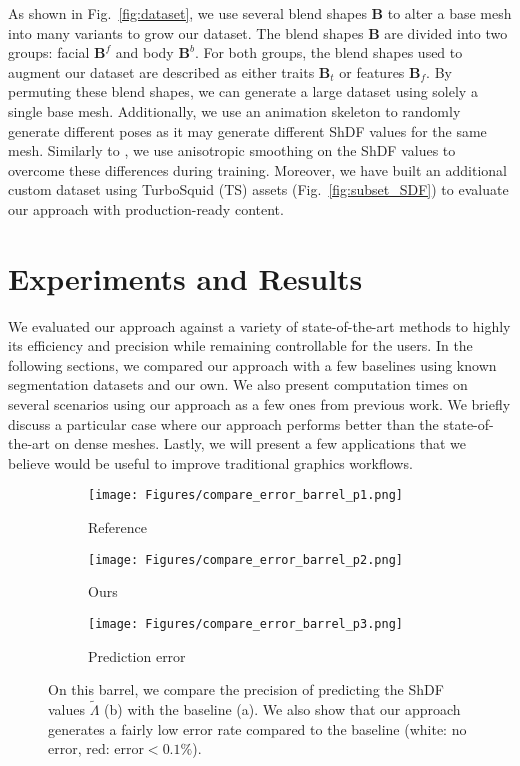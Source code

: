 As shown in Fig.~\ref{fig:dataset}, we use several blend shapes $\textbf{B}$ to alter a base mesh into many variants to grow our dataset. The blend shapes $\textbf{B}$ are divided into two groups: facial $\textbf{B}^{f}$ and body $\textbf{B}^{b}$. For both groups, the blend shapes used to augment our dataset are described as either traits $\textbf{B}_{t}$ or features $\textbf{B}_{f}$. By permuting these blend shapes, we can generate a large dataset using solely a single base mesh. Additionally, we use an animation skeleton to randomly generate different poses as it may generate different ShDF values for the same mesh. Similarly to \cite{shapira2008consistent}, we use anisotropic smoothing on the ShDF values to overcome these differences during training. Moreover, we have built an additional custom dataset using TurboSquid (TS) assets (Fig.~\ref{fig:subset_SDF}) to evaluate our approach with production-ready content.

\section{Experiments and Results}
We evaluated our approach against a variety of state-of-the-art methods to highly its efficiency and precision while remaining controllable for the users. In the following sections, we compared our approach with a few baselines using known segmentation datasets and our own. We also present computation times on several scenarios using our approach as a few ones from previous work. We briefly discuss a particular case where our approach performs better than the state-of-the-art on dense meshes. Lastly, we will present a few applications that we believe would be useful to improve traditional graphics workflows.

\begin{figure}[h]
     \centering
     \begin{subfigure}{0.125\textwidth}
         \centering
         \texttt{[image: Figures/compare\_error\_barrel\_p1.png]}
         \caption{Reference}
         \label{fig:sdf_seg}
     \end{subfigure}
     \hfill
     \begin{subfigure}{0.2098\textwidth}
         \centering
         \texttt{[image: Figures/compare\_error\_barrel\_p2.png]}
         \caption{Ours}
         \label{fig:unwrapping_uvs}
     \end{subfigure}
     \begin{subfigure}{0.125\textwidth}
         \centering
         \texttt{[image: Figures/compare\_error\_barrel\_p3.png]}
         \caption{Prediction error}
         \label{fig:unwrapping_uvs}
     \end{subfigure}
    \caption{On this barrel, we compare the precision of predicting the ShDF values $\tilde{\Lambda}$ (b) with the baseline (a). We also show that our approach generates a fairly low error rate compared to the baseline (white: no error, red: error$<0.1\%$).}
    \label{fig:barrel_error}
\end{figure}

